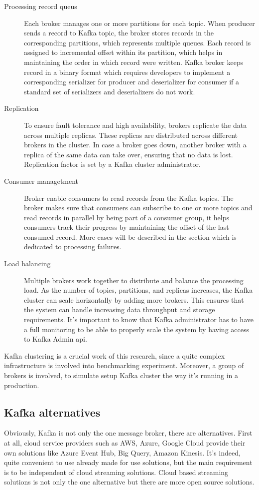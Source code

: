 \begin{description}
    \item[Processing record queus] Each broker manages one or more partitions for each topic.
    When producer sends a record to Kafka topic, the broker stores records
    in the corresponding partitions, which represents multiple queues.
    Each record is assigned to incremental offset within its partition,
    which helps in maintaining the order in which record were written.
    Kafka broker keeps record in a binary format which requires developers
    to implement a corresponding serializer for producer and deserializer for consumer
    if a standard set of serializers and deserializers do not work.
    \item[Replication] To ensure fault tolerance and high availability,
    brokers replicate the data across multiple replicas.
    These replicas are distributed across different brokers in the cluster.
    In case a broker goes down, another broker with a replica of the same data can take over,
    ensuring that no data is lost.
    Replication factor is set by a Kafka cluster administrator.
    \item[Consumer managetment] Broker enable consumers to read records from the Kafka topics.
    The broker makes sure that
    consumers can subscribe to one or more topics and read records
    in parallel by being part of a consumer group, it
    helps consumers track their progress by maintaining
    the offset of the last consumed record.
    More cases will be described in the section which is dedicated to
    processing failures.
    \item[Load balancing] Multiple brokers work together to distribute and balance the processing load.
    As the number of topics, partitions, and replicas increases,
    the Kafka cluster can scale horizontally by adding more brokers.
    This ensures that the system can handle increasing data throughput and storage requirements.
    It's important to know that Kafka administrator has to have a full monitoring
    to be able to properly scale the system by having access to Kafka Admin api.
\end{description}

Kafka clustering is a crucial work of this research, since a quite complex infrastructure
is involved into benchmarking experiment.
Moreover, a group of brokers is involved, to simulate setup Kafka cluster the way
it's running in a production.

\newpage
\subsection{Kafka alternatives}\label{subsec:kafka-alternatives}
Obviously, Kafka is not only the one message broker, there are alternatives.
First at all, cloud service providers such as AWS, Azure, Google Cloud
provide their own solutions like Azure Event Hub, Big Query, Amazon Kinesis.
It's indeed, quite convenient to use already made for use solutions, but
the main requirement is to be independent of cloud streaming solutions.
Cloud based streaming solutions is not only the one alternative but there
are more open source solutions.

